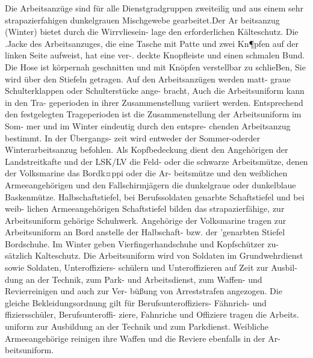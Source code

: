 

Die Arbeitsanzüge sind für alle Dienstgradgruppen
zweiteilig und aus einem sehr strapazierfahigen
dunkelgrauen Mischgewebe gearbeitet.Der Ar
beitsanzug (Winter) bietet durch die Wirrvliesein-
lage den erforderlichen Kälteschutz. Die .Jacke des
Arbeitsanzuges, die eine Tasche mit Patte und zwei Kn¶pfen auf der linken Seite aufweist, hat eine ver-.
deckte Knopfleiste und einen schmalen Bund. Die
Hose ist körpernah geschnitten und mit Knöpfen
verstellbar zu schlieBen, Sie wird über den Stiefeln
getragen. Auf den Arbeitsanzügen werden matt-
graue Schulterklappen oder Schulterstücke ange-
bracht, Auch die Arbeitsuniform kann in den Tra-
geperioden in ihrer Zusammenstellung
variiert
werden.
Entsprechend den festgelegten Trageperioden ist
die Zusammenstellung der Arbeitsuniform im Som-
mer und im Winter eindeutig durch den entspre-
chenden Arbeitsanzug bestimmt. In der Übergangs-
zeit wird entweder der Sommer-oderder
Winterarbeitsanzug befohlen. Als Kopfbedeckung
dient den Angehörigen der Landstreitkafte und der LSK/LV die Feld- oder die schwarze Arbeitsmütze,
denen der Volksmarine das Bordk¤ppi oder die Ar-
beitsmütze und den weiblichen Armeeangehörigen
und den Fallschirmjägern die dunkelgraue oder
dunkelblaue Baskenmütze. Halbschaftstiefel, bei
Berufssoldaten genarbte Schaftstiefel und bei weib-
lichen Armeeangehörigen Schaftstiefel bilden das
strapazierfähige, zur
Arbeitsuniform
gehörige
Schuhwerk. Angehörige der Volksmarine tragen zur
Arbeitsuniform an Bord anstelle der Halbschaft-
bzw. der 'genarbten Stiefel Bordschuhe. Im Winter
geben Vierfingerhandschuhe und Kopfschützer zu-
sätzlich Kalteschutz.
Die Arbeitsuniform wird von Soldaten im
Grundwehrdienst sowie Soldaten, Unteroffiziers-
schülern und Unteroffizieren auf Zeit zur Ausbil-
dung an der Technik, zum Park- und Arbeitsdienst,
zum Waffen- und Revierreinigen und auch zur Ver-
büßung von Arreststrafen angezogen. Die gleiche Bekleidungsordnung gilt für Berufsunteroffiziers-
Fähnrich- und ffiziersschüler, Berufsunteroffi-
ziere, Fahnriche und Offiziere tragen die Arbeits.
uniform zur Ausbildung an der Technik und zum
Parkdienst. Weibliche Armeeangehörige reinigen
ihre Waffen und die Reviere ebenfalls in der Ar-
beitsuniform.